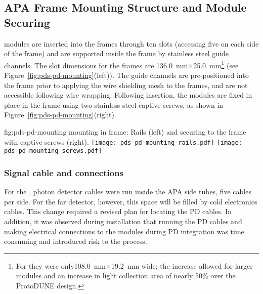 \subsection{APA Frame Mounting Structure and Module Securing}	
\label{sec:fdsp-pd-assy-frames}

 modules are inserted into the  frames through ten slots 
(accessing five on each side of the  frame) and are supported inside the frame by 
stainless steel guide channels.  The slot dimensions for the   frames 
are \SI{136.0}{mm}$\times$\SI{25.0}{mm}\footnote{For  they were only\SI{108.0}{mm}$\times$\SI{19.2}{mm} wide; the increase allowed for larger  modules and an increase in light collection area of nearly 50\% over the ProtoDUNE design.}   
(see Figure~\ref{fig:pds-pd-mounting}(left)).
The guide channels are pre-positioned into the  frame prior to applying the wire shielding mesh to the  frames, and are not accessible following wire wrapping. Following insertion, the  modules are fixed in place in the  frame using two stainless steel captive screws, as shown in Figure~\ref{fig:pds-pd-mounting}(right).
 

\begin{dunefigure}{fig:pds-pd-mounting}
{ mounting in  frame: Rails (left) and securing to the frame with captive screws  (right).}
	\texttt{[image: pds-pd-mounting-rails.pdf]}
	\texttt{[image: pds-pd-mounting-screws.pdf]}
\end{dunefigure}

\subsubsection{Signal cable and connections}

For the  , photon detector cables were run inside the APA side tubes, five cables per side.  For the far detector, however, this space will be filled by cold electronics cables.  This change required a revised plan for locating the PD cables.  In addition, it was observed during   installation that running the PD cables and making electrical connections to the modules during PD integration was time consuming and introduced risk to the process.

